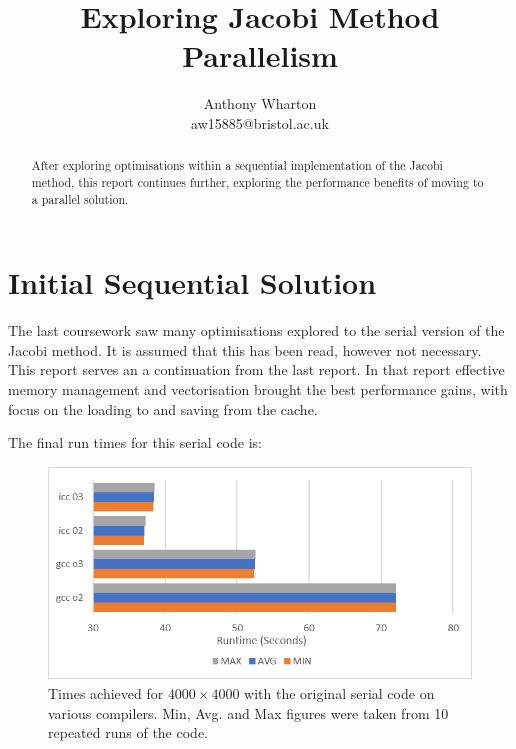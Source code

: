 \documentclass[11pt,twocolumn,a4paper]{article}
\begin{document}
\title{\LARGE\bfseries Exploring Jacobi Method Parallelism}
\date{\vspace{-1cm}} %
\author{Anthony Wharton \\ aw15885@bristol.ac.uk}
\maketitle

\begin{abstract}
After exploring optimisations within a sequential implementation of the Jacobi method, this report continues further, exploring the performance benefits of moving to a parallel solution.
\end{abstract}


\section{Initial Sequential Solution}
The last coursework saw many optimisations explored to the serial version of the Jacobi method. It is assumed that this has been read, however not necessary. This report serves an a continuation from the last report. In that report effective memory management and vectorisation brought the best performance gains, with focus on the loading to and saving from the cache. \par

The final run times for this serial code is:

\begin{figure}[h]
        \centering
        \includegraphics[width=0.8\linewidth]{figures/1-SEQ.png}
        \caption{Times achieved for $4000\times4000$ with the original serial code on various compilers. Min, Avg. and Max figures were taken from 10 repeated runs of the code.}
        \label{fig-1-seq}
\end{figure}
\end{document}
